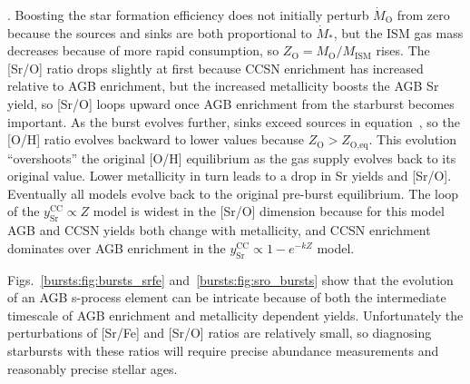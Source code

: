 \citep[][equations (11) and (14)]{Weinberg2017b}. Boosting the star 
formation efficiency does not initially perturb $\dot{M}_\text{O}$ from 
zero because the sources and sinks are both proportional to $\dot{M}_*$, but 
the ISM gas mass decreases because of more rapid consumption, so 
$Z_\text{O} = M_\text{O}/M_\text{ISM}$ rises. The [Sr/O] ratio drops slightly 
at first because CCSN enrichment has increased relative to AGB enrichment, but 
the increased metallicity boosts the AGB Sr yield, so [Sr/O] loops upward once 
AGB enrichment from the starburst becomes important. As the burst evolves 
further, sinks exceed sources in equation~, so the [O/H] 
ratio evolves backward to lower values because $Z_\text{O} > Z_\text{O,eq}$. 
This evolution ``overshoots'' the original [O/H] equilibrium as the gas supply 
evolves back to its original value. Lower metallicity in turn leads to a drop 
in Sr yields and [Sr/O]. Eventually all models evolve back to the original 
pre-burst equilibrium. The loop of the $y_\text{Sr}^\text{CC} \propto Z$ model 
is widest in the [Sr/O] dimension because for this model AGB and CCSN yields 
both change with metallicity, and CCSN enrichment dominates over AGB enrichment 
in the $y_\text{Sr}^\text{CC} \propto 1 - e^{-kZ}$ model. 
\par 
Figs.~\ref{bursts:fig:bursts_srfe} and~\ref{bursts:fig:sro_bursts} show that the evolution of 
an AGB s-process element can be intricate because of both the intermediate 
timescale of AGB enrichment and metallicity dependent yields. Unfortunately the 
perturbations of [Sr/Fe] and [Sr/O] ratios are relatively small, so diagnosing 
starbursts with these ratios will require precise abundance measurements 
and reasonably precise stellar ages. 

